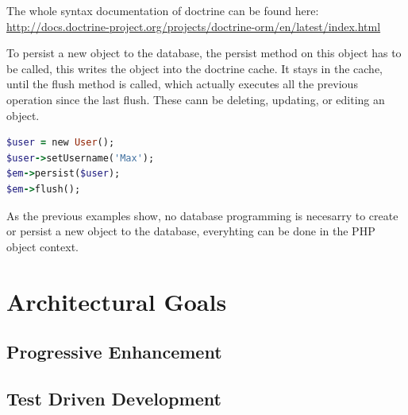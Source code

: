 The whole syntax documentation of doctrine can be found here: \url{http://docs.doctrine-project.org/projects/doctrine-orm/en/latest/index.html} 

To persist a new object to the database, the persist method on this object has to be called, this writes the object into the doctrine cache. It stays in the cache, until the flush method is called, which actually executes all the previous operation since the last flush. These cann be deleting, updating, or editing an object.

\begin{lstlisting}[caption=Persisting an object to the database in Doctrine, label=list:persistingObjectDoctrine, language=Ruby]
$user = new User();
$user->setUsername('Max');
$em->persist($user);
$em->flush();
\end{lstlisting}

As the previous examples show, no database programming is necesarry to create or persist a new object to the database, everyhting can be done in the PHP object context.

\section{Architectural Goals}

\subsection{Progressive Enhancement}

\subsection{Test Driven Development}